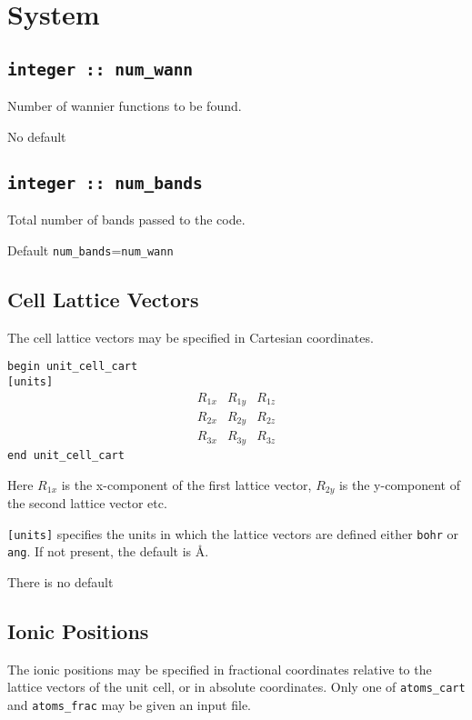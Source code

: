 \clearpage


\section{System}

\subsection[num\_wann]{\tt integer :: num\_wann}
Number of wannier functions to be found.

No default

\subsection[num\_bands]{\tt integer :: num\_bands} 

Total number of bands passed to the code.

Default \verb#num_bands#=\verb#num_wann#

\subsection[Cell Lattice Vectors]{Cell Lattice Vectors}

The cell lattice vectors may be specified in Cartesian coordinates.


\noindent \verb#begin unit_cell_cart# \\
\verb#[units]#
$$
\begin{array}{ccc}
R_{1x} & R_{1y} & R_{1z} \\
R_{2x} & R_{2y} & R_{2z} \\
R_{3x} & R_{3y} & R_{3z}
\end{array}
$$
\verb#end unit_cell_cart#

Here $R_{1x}$ is the x-component of the first lattice vector,
$R_{2y}$ is the y-component of the second lattice vector etc.

\verb#[units]# specifies the units in which the lattice vectors are
defined either \verb#bohr# or \verb#ang#. If not present, the default is \AA.


There is no default



\subsection[Ionic Positions]{Ionic Positions}

The ionic positions may be specified in fractional coordinates relative
to the lattice vectors of the unit cell, or in absolute coordinates.
Only one of \verb#atoms_cart# and \verb#atoms_frac# may be given an input
file.


